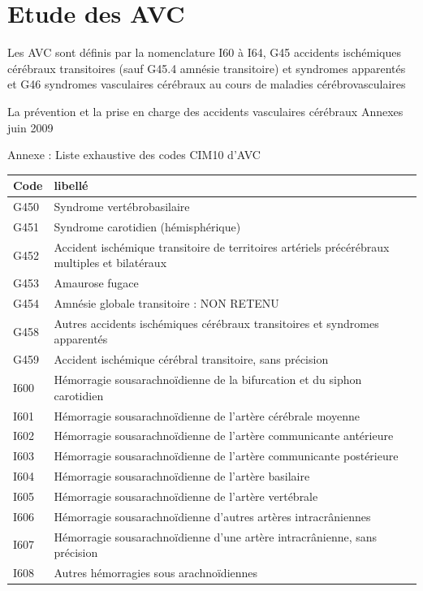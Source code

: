 \documentclass[12pt,english,french,twoside]{book}\usepackage[]{graphicx}\usepackage[]{color}
\begin{document}
\section{Etude des AVC}

Les AVC sont définis par la nomenclature I60 à I64, G45 accidents ischémiques cérébraux transitoires (sauf G45.4 amnésie transitoire) et syndromes apparentés et G46 syndromes vasculaires cérébraux au cours de maladies cérébrovasculaires

La prévention et la prise en charge des accidents vasculaires cérébraux  Annexes 
juin 2009

Annexe : Liste exhaustive des codes CIM10 d’AVC
{\footnotesize
\begin{longtable}{|l|l|}
 \hline
 Code & libellé\\
 \hline
 G450 & Syndrome vertébrobasilaire \\
 G451 & Syndrome carotidien (hémisphérique) \\
 G452 & Accident ischémique transitoire de territoires artériels précérébraux multiples et bilatéraux \\
 G453 & Amaurose fugace \\
 G454 & Amnésie globale transitoire : NON RETENU \\
 G458 & Autres accidents ischémiques cérébraux transitoires et syndromes apparentés \\
 G459 & Accident ischémique cérébral transitoire, sans précision \\
 I600 & Hémorragie sousarachnoïdienne de la bifurcation et du siphon carotidien \\
 I601 & Hémorragie sousarachnoïdienne de l'artère cérébrale moyenne \\
 I602 & Hémorragie sousarachnoïdienne de l'artère communicante antérieure \\
 I603 & Hémorragie sousarachnoïdienne de l’artère communicante postérieure \\
 I604 & Hémorragie sousarachnoïdienne de l'artère basilaire \\
 I605 & Hémorragie sousarachnoïdienne de l'artère vertébrale \\
 I606 & Hémorragie sousarachnoïdienne d'autres artères intracrâniennes \\
 I607 & Hémorragie sousarachnoïdienne d'une artère intracrânienne, sans précision \\
 I608 & Autres hémorragies sous arachnoïdiennes \\

\end{longtable}}
\end{document}
